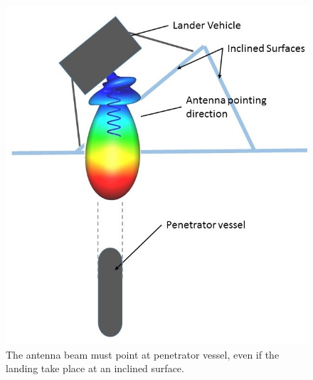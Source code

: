\begin{figure}[ht]
\centering
\includegraphics[width=.6\textwidth]{figures/Yannis/normal.jpg}
\caption{The antenna beam must point at penetrator vessel, even if the landing take place at an inclined surface.}
\label{ant steer}
\end{figure}
